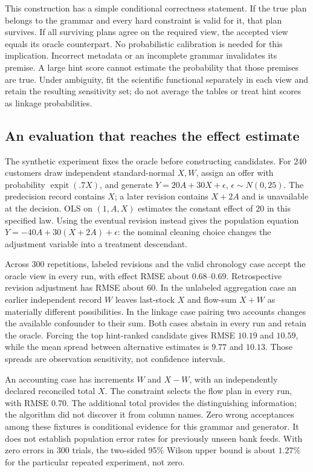 This construction has a simple conditional correctness statement. If the
true plan belongs to the grammar and every hard constraint is valid for
it, that plan survives. If all surviving plans agree on the required view,
the accepted view equals its oracle counterpart. No probabilistic calibration
is needed for this implication. Incorrect metadata or an incomplete grammar
invalidates its premise. A large hint score cannot estimate the probability
that those premises are true. Under ambiguity, fit the scientific functional
separately in each view and retain the resulting sensitivity set; do not
average the tables or treat hint scores as linkage probabilities.

\subsection{An evaluation that reaches the effect estimate}
The synthetic experiment fixes the oracle before constructing candidates.
For 240 customers draw independent standard-normal $X,W$, assign an offer
with probability $\operatorname{expit}(.7X)$, and generate
$Y=20A+30X+\epsilon$, $\epsilon\sim N(0,25)$. The predecision record
contains $X$; a later revision contains $X+2A$ and is unavailable at the
decision. OLS on $(1,A,X)$ estimates the constant effect of 20 in this
specified law. Using the eventual revision instead gives the population
equation $Y=-40A+30(X+2A)+\epsilon$: the nominal cleaning choice changes
the adjustment variable into a treatment descendant.

Across 300 repetitions, labeled revisions and the valid chronology case
accept the oracle view in every run, with effect RMSE about $0.68$--$0.69$.
Retrospective revision adjustment has RMSE about $60$. In the unlabeled
aggregation case an earlier independent record $W$ leaves last-stock $X$
and flow-sum $X+W$ as materially different possibilities. In the linkage
case pairing two accounts changes the available confounder to their sum.
Both cases abstain in every run and retain the oracle. Forcing the top
hint-ranked candidate gives RMSE $10.19$ and $10.59$, while the mean
spread between alternative estimates is $9.77$ and $10.13$. Those spreads
are observation sensitivity, not confidence intervals.

An accounting case has increments $W$ and $X-W$, with an independently
declared reconciled total $X$. The constraint selects the flow plan in every
run, with RMSE $0.70$. The additional total provides the distinguishing
information; the algorithm did not discover it from column names.
Zero wrong acceptances among these fixtures is conditional evidence for
this grammar and generator. It does not establish population error rates
for previously unseen bank feeds. With zero errors in 300 trials, the
two-sided 95\% Wilson upper bound is about $1.27\%$ for the particular
repeated experiment, not zero.

